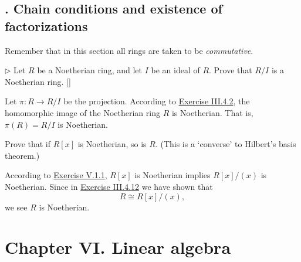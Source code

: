 \documentclass[12pt,letterpaper,boxed]{hmcpset}
\begin{document}
\subsection{. Chain conditions and existence of factorizations}
Remember that in this section all rings are taken to be \emph{commutative}.

\hypertarget{Exercise V.1.1}{}
\begin{problem}[1.1]
	$\triangleright$ Let $R$ be a Noetherian ring, and let $I$ be an ideal of $R$. Prove that $R / I$ is a Noetherian ring. []
\end{problem}
\begin{solution}
	Let $\pi:R\to R / I$ be the projection. According to \hyperlink{Exercise III.4.2}{Exercise III.4.2}, the homomorphic image of the Noetherian ring $R$ is Noetherian. That is, $\pi(R)=R / I$ is Noetherian.
\end{solution}

\begin{problem}[1.2]
Prove that if $R[x]$ is Noetherian, so is $R$. (This is a `converse' to Hilbert's basis theorem.)
\end{problem}
\begin{solution}
According to \hyperlink{Exercise V.1.1}{Exercise V.1.1}, $R[x]$ is Noetherian implies $R\left[x\right]/\left(x\right)$ is Noetherian. Since in \hyperlink{Exercise III.4.12}{Exercise III.4.12} we have shown that
\[
R\cong R\left[x\right]/\left(x\right),
\]
we see $R$ is Noetherian.
\end{solution}


\newpage
\section{Chapter VI.\hspace{0.2em} Linear algebra}
\end{document}
